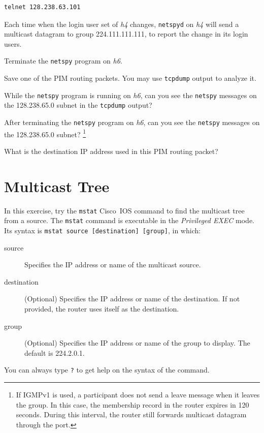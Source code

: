 \documentclass{../UTNetLab}
\begin{document}
\begin{lstlisting}
telnet 128.238.63.101
    \end{lstlisting}

Each time when the login user set of \textit{h4} changes, \lstinline{netspyd} on \textit{h4} will send a multicast datagram to group 224.111.111.111, to report the change in its login users.

Terminate the \lstinline{netspy} program on \textit{h6}.

Save one of the PIM routing packets.
You may use \lstinline{tcpdump} output to analyze it.

\begin{report}
    \item While the \lstinline{netspy} program is running on \textit{h6},
    can you see the \lstinline{netspy} messages on the 128.238.65.0 subnet in the \lstinline{tcpdump} output?

    \item After terminating the \lstinline{netspy} program on \textit{h6},
    can you see the \lstinline{netspy} messages on the 128.238.65.0 subnet?%
    \footnote{If IGMPv1 is used, a participant does not send a leave message when it leaves the group.
        In this case, the membership record in the router expires in 120 seconds.
        During this interval, the router still forwards multicast datagram through the port.}

    \item What is the destination IP address used in this PIM routing packet?
\end{report}

\section{Multicast Tree}
In this exercise, try the \lstinline[language={cisco}]{mstat} Cisco~IOS command to find the multicast tree from a source.
The \lstinline[language={cisco}]{mstat} command is executable in the \textit{Privileged EXEC} mode.
Its syntax is \lstinline[language={cisco}, emph={source, destination, group}]{mstat source [destination] [group]}, in which:
\begin{description}
    \item[source] Specifies the IP address or name of the multicast source.
    \item[destination] (Optional) Specifies the IP address or name of the destination. If not provided, the router uses itself as the destination.
    \item[group] (Optional) Specifies the IP address or name of the group to display. The default is 224.2.0.1.
\end{description}
You can always type \lstinline[language={cisco}]{?} to get help on the syntax of the command.
\end{document}
